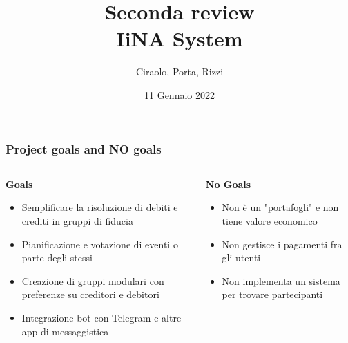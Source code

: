\documentclass[11pt]{beamer}
\begin{document}
	\author{Ciraolo, Porta, Rizzi}

	\begin{frame}[plain]
		\title[IiNA System]{Seconda review\\IiNA System}
		\date{11 Gennaio 2022}
		\maketitle
	\end{frame}

	\begin{frame}
		\frametitle{Project goals and NO goals}
		
		\begin{columns}
			\begin{column}{.45\linewidth}
				\begin{center}
					\textbf{Goals}
				\end{center}
				\begin{itemize}
					\item Semplificare la risoluzione di debiti e crediti in gruppi di fiducia
					\item Pianificazione e votazione di eventi o parte degli stessi
					\item Creazione di gruppi modulari con preferenze su creditori e debitori
					\item Integrazione bot con Telegram e altre app di messaggistica
				\end{itemize}
			\end{column}
			\begin{column}{.45\linewidth}
				\begin{center}
					\textbf{No Goals}
				\end{center}
				\begin{itemize}
					\item Non è un "portafogli" e non tiene valore economico
					\item Non gestisce i pagamenti fra gli utenti%
					\item Non implementa un sistema per trovare partecipanti
				\end{itemize}
			\end{column}
		\end{columns}
	\end{frame}
\end{document}
